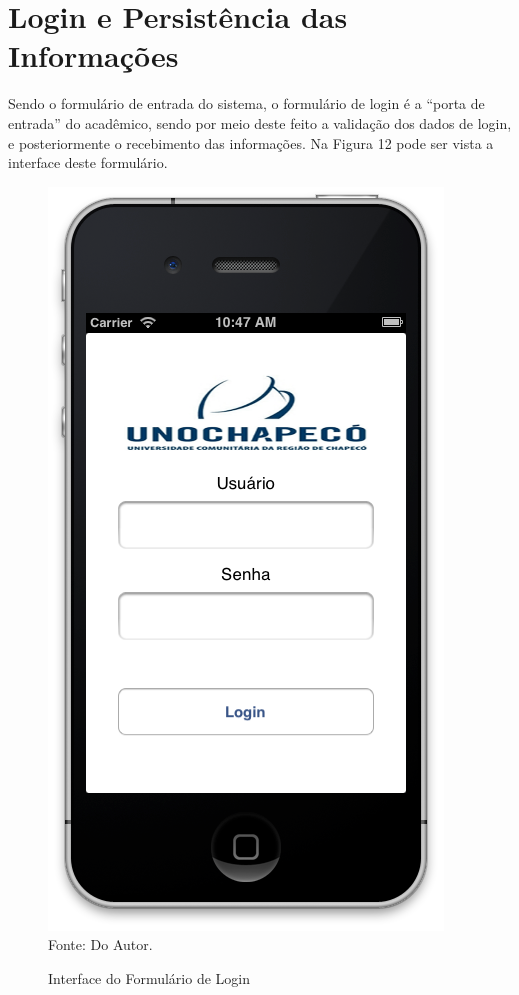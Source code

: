 \section{Login e Persistência das Informações}
Sendo o formulário de entrada do sistema, o formulário de login é a ``porta de entrada'' do acadêmico, sendo por meio deste feito a validação dos dados de login, e posteriormente o recebimento das informações. Na Figura 12 pode ser vista a interface deste formulário.

\begin{figure}[!htb]
     \centering
     \caption[Formulário de Login - Interface]{Interface do Formulário de Login}
     \includegraphics[scale=0.5]{imagens/formlogin.png}
     \\  Fonte: Do Autor.
\end{figure}

